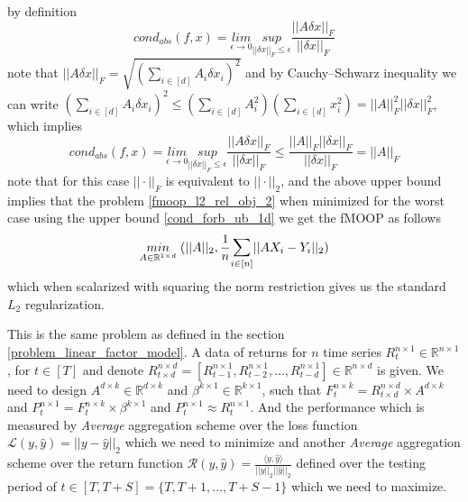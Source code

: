 by definition 
\begin{equation}
    cond_{abs}(f,x) = \underset{\epsilon \to 0}{lim}\underset{||\delta x||_F\le \epsilon}{sup} \frac{||A\delta x||_F}{||\delta x||_F}
\end{equation}
note that $||A\delta x||_F = \sqrt{(\sum_{i\in [d]} A_i\delta x_i)^2}$ and by Cauchy–Schwarz inequality we can write $(\sum_{i\in [d]} A_i\delta x_i)^2 \le (\sum_{i\in [d]} A^2_i)(\sum_{i\in [d]} x^2_i) =||A||^2_F||\delta x||^2_F $, which implies 
\begin{equation} \label{cond_forb_ub_1d}
    cond_{abs}(f,x) = \underset{\epsilon \to 0}{lim}\underset{||\delta x||_F\le \epsilon}{sup} \frac{||A\delta x||_F}{||\delta x||_F} \le \frac{||A||_F||\delta x||_F}{||\delta x||_F} = ||A||_F
\end{equation}
note that for this case $||\cdot||_F$ is equivalent to $||\cdot||_2$, and the above upper bound implies that the problem \ref{fmoop_l2_rel_obj_2} when minimized for the worst case using the upper bound \ref{cond_forb_ub_1d} we get the fMOOP as follows
\begin{equation} \label{fmoop_l2_rel_obj_new}
    \underset{A \in \mathbb{R}^{1\times d}}{min}\hspace{1mm} (||A||_2, \frac{1}{n}\mathlarger{\sum}_{i\in [n]} ||AX_i-Y_i||_2)
\end{equation}
which when scalarized with squaring the norm restriction gives us the standard $L_2$ regularization.

 \label{results_problem_1}
This is the same problem as defined in the section \ref{problem_linear_factor_model}.
\newline A data of returns for $n$ time series $R^{n\times 1}_t \in \mathbb{R}^{n\times 1}$, for $t\in [T]$ and denote $R^{n\times d}_{t\times d} = [R^{n\times 1}_{t-1},R^{n\times 1}_{t-2},...,R^{n\times 1}_{t-d}] \in \mathbb{R}^{n\times d}$ is given.
\newline \newline We need to design $A^{d\times k} \in  \mathbb{R}^{d\times k}$ and $\beta^{k\times 1} \in \mathbb{R}^{k\times 1}$, such that $F^{n\times k}_t = R^{n\times d}_{t\times d}\times A^{d\times k}$ and $P^{n \times 1}_{t} = F^{n\times k}_t \times \beta^{k \times 1}$ and $P^{n \times 1}_{t} \approx R^{n \times 1}_{t}$. And the performance  which is measured by \textit{Average} aggregation scheme over the loss function $\mathcal{L}(y,\hat{y}) = ||y-\hat{y}||_2$ which we need to minimize and another \textit{Average} aggregation scheme over the return function $\mathcal{R}(y,\hat{y}) = \frac{\langle y,\hat{y}\rangle}{||y||_2||\hat{y}||_2}$ defined over the testing period of $t \in [T,T+S]= \{T,T+1,...,T+S-1\}$ which we need to maximize.

